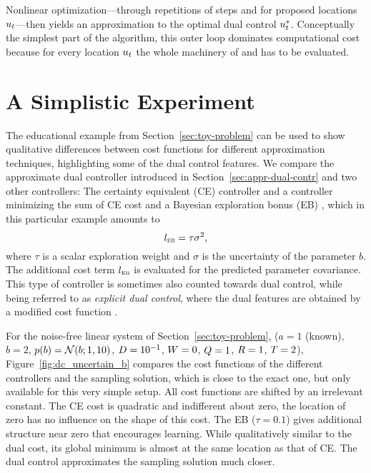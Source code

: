Nonlinear optimization---through repetitions of steps  and 
for proposed locations $u_t$---then yields an approximation to the optimal
dual control $u_t^*$. Conceptually the simplest part of the algorithm, this
outer loop dominates computational cost because for every location $u_t$ the
whole machinery of  and  has to be evaluated.

\section{A Simplistic Experiment}
\label{sec:toy-experiment}

The educational example from Section~\ref{sec:toy-problem} can be used to show
qualitative differences between cost functions for different approximation
techniques, highlighting some of the dual control features. We compare the
approximate dual controller introduced in Section~\ref{sec:appr-dual-contr} and
two other controllers: The certainty equivalent (CE) controller and a
controller minimizing the sum of CE cost and a Bayesian exploration bonus (EB)
\cite{Wittenmark:1975:Active}, which in this particular example amounts to
\begin{equation}
  l_{\normalfont\textsc{eb}} =  \tau \sigma^2,
\end{equation}
where $\tau$ is a scalar exploration weight and $\sigma$ is the uncertainty
of the parameter $b$. The additional cost term $l_{\normalfont\textsc{eb}}$ is evaluated for
the predicted parameter covariance. This type of controller is sometimes also
counted towards dual control, while being referred to as \emph{explicit dual
control}, where the dual features are obtained by a modified cost function
\cite{Filatov.Unbehauen:2000:Survey}.

For the noise-free linear system of Section~\ref{sec:toy-problem}, ($a = 1$
(known), $b = 2$, $p(b)=\mathcal{N}(b; 1, 10)$, $D = 10^{-1}$, $W = 0$, $Q = 1$,
$R = 1$, $T=2$), Figure~\ref{fig:dc_uncertain_b} compares the cost
functions of the different controllers and the sampling solution, which is
close to the exact one, but only available for this very simple setup. All cost
functions are shifted by an irrelevant constant. The CE cost is quadratic and
indifferent about zero, \ie the location of zero has no influence on the shape
of this cost. The EB ($\tau = 0.1$) gives additional structure near zero that
encourages learning. While qualitatively similar to the dual cost, its global
minimum is almost at the same location as that of CE. The dual control
approximates the sampling solution much closer.

